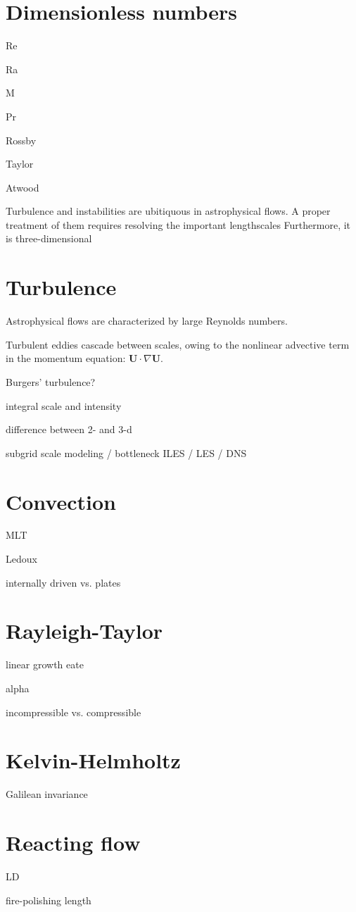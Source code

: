 \section{Dimensionless numbers}


Re

Ra

M

Pr

Rossby

Taylor

Atwood


Turbulence and instabilities are ubitiquous in astrophysical flows.  
A proper treatment of them requires resolving the important lengthscales
Furthermore, it is three-dimensional


\section{Turbulence}

Astrophysical flows are characterized by large Reynolds numbers.  

Turbulent eddies cascade between scales, owing to the nonlinear advective 
term in the momentum equation: $\mathbf{U} \cdot \nabla \mathbf{U}$.  

Burgers' turbulence?

integral scale and intensity

difference between 2- and 3-d

subgrid scale modeling / bottleneck
ILES / LES / DNS








\section{Convection}

MLT

Ledoux

internally driven vs. plates





\section{Rayleigh-Taylor}

linear growth eate

alpha

incompressible vs. compressible



\section{Kelvin-Helmholtz}


Galilean invariance



\section{Reacting flow}

LD

fire-polishing length



